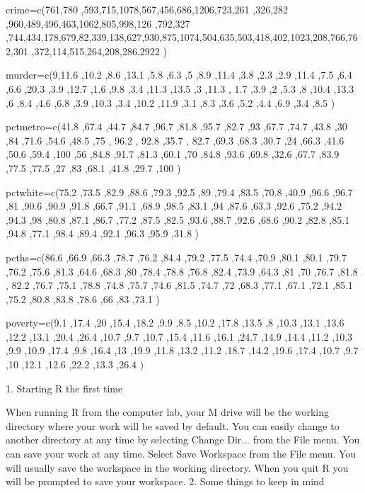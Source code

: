 \documentclass[a4paper,12pt]{article}
\begin{document}
crime=c(761,780 ,593,715,1078,567,456,686,1206,723,261 ,326,282 ,960,489,496,463,1062,805,998,126 ,792,327 ,744,434,178,679,82,339,138,627,930,875,1074,504,635,503,418,402,1023,208,766,762,301 ,372,114,515,264,208,286,2922 )

murder=c(9,11.6 ,10.2 ,8.6 ,13.1 ,5.8 ,6.3 ,5 ,8.9 ,11.4 ,3.8 ,2.3 ,2.9 ,11.4 ,7.5 ,6.4 ,6.6 ,20.3 ,3.9 ,12.7 ,1.6 ,9.8 ,3.4 ,11.3 ,13.5 ,3 ,11.3 ,
1.7 ,3.9 ,2 ,5.3 ,8 ,10.4 ,13.3 ,6 ,8.4 ,4.6 ,6.8 ,3.9 ,10.3 ,3.4 ,10.2 ,11.9 ,3.1 ,8.3 ,3.6 ,5.2 ,4.4 ,6.9 ,3.4 ,8.5 )

pctmetro=c(41.8 ,67.4 ,44.7 ,84.7 ,96.7 ,81.8 ,95.7 ,82.7 ,93 ,67.7 ,74.7 ,43.8 ,30 ,84 ,71.6 ,54.6 ,48.5 ,75 , 96.2 , 92.8 ,35.7 ,
82.7 ,69.3 ,68.3 ,30.7 ,24 ,66.3 ,41.6 ,50.6 ,59.4 ,100 ,56 ,84.8 ,91.7 ,81.3 ,60.1 ,70 ,84.8 ,93.6 ,69.8 ,32.6 ,67.7 ,83.9 ,77.5 ,77.5 ,27 ,83 ,68.1 ,41.8 ,29.7 ,100 )

pctwhite=c(75.2 ,73.5 ,82.9 ,88.6 ,79.3 ,92.5 ,89 ,79.4 ,83.5 ,70.8 ,40.9 ,96.6 ,96.7 ,81 ,90.6 ,90.9 ,91.8 ,66.7 ,91.1 ,68.9 ,98.5 ,83.1 ,94 ,87.6 ,63.3 ,92.6 ,75.2 ,94.2 ,94.3 ,98 ,80.8 ,87.1 ,86.7 ,77.2 ,87.5 ,82.5 ,93.6 ,88.7 ,92.6 ,68.6 ,90.2 ,82.8 ,85.1 ,94.8 ,77.1 ,98.4 ,89.4 ,92.1 ,96.3 ,95.9 ,31.8 )

pcths=c(86.6 ,66.9 ,66.3 ,78.7 ,76.2 ,84.4 ,79.2 ,77.5 ,74.4 ,70.9 ,80.1 ,80.1 ,79.7 ,76.2 ,75.6 ,81.3 ,64.6 ,68.3 ,80 ,78.4 ,78.8 ,76.8 ,82.4 ,73.9 ,64.3 ,81 ,70 ,76.7 ,81.8 , 82.2 ,76.7 ,75.1 ,78.8 ,74.8 ,75.7 ,74.6 ,81.5 ,74.7 ,72 ,68.3 ,77.1 ,67.1 ,72.1 ,85.1 ,75.2 ,80.8 ,83.8 ,78.6 ,66 ,83 ,73.1 )

poverty=c(9.1 ,17.4 ,20 ,15.4 ,18.2 ,9.9 ,8.5 ,10.2 ,17.8 ,13.5 ,8 ,10.3 ,13.1 ,13.6 ,12.2 ,13.1 ,20.4 ,26.4 ,10.7 ,9.7 ,10.7 ,15.4 ,11.6 ,16.1 ,24.7 ,14.9 ,14.4 ,11.2 ,10.3 ,9.9 ,10.9 ,17.4 ,9.8 ,16.4 ,13 ,19.9 ,11.8 ,13.2 ,11.2 ,18.7 ,14.2 ,19.6 ,17.4 ,10.7 ,9.7 ,10 ,12.1 ,12.6 ,22.2 ,13.3 ,26.4 )




\newpage




1. Starting R the first time


When running R from the computer lab, your M drive will be the working directory where your work will be saved by default. You can easily change to another directory at any time by selecting Change Dir... from the File menu. 
You can save your work at any time. Select Save Workspace from the File menu. You will usually save the workspace in the working directory. When you quit R you will be prompted to save your workspace. 
2. Some things to keep in mind
\end{document}
